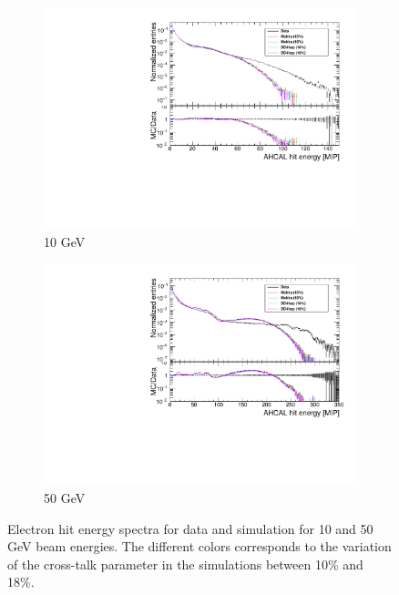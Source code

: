 \begin{figure}[htbp!]
	\centering
	\begin{subfigure}[t]{0.49\textwidth}
		\includegraphics[width=1.\linewidth]{../Thesis_Plots/EnergyCalib/Plots/HitEnergy_Electrons10GeV.pdf}
		\caption{10 GeV} \label{fig:HitEnergy10GeVe}
	\end{subfigure}
	\hfill
	\begin{subfigure}[t]{0.49\textwidth}
		\includegraphics[width=1.\linewidth]{../Thesis_Plots/EnergyCalib/Plots/HitEnergy_Electrons50GeV.pdf}
		\caption{50 GeV} \label{fig:HitEnergy50GeVe}
	\end{subfigure}
	\caption{Electron hit energy spectra for data and simulation for 10 and 50 GeV beam energies. The different colors corresponds to the variation of the cross-talk parameter in the simulations between 10\% and 18\%.}
	\label{fig:eHitVal}
\end{figure}

